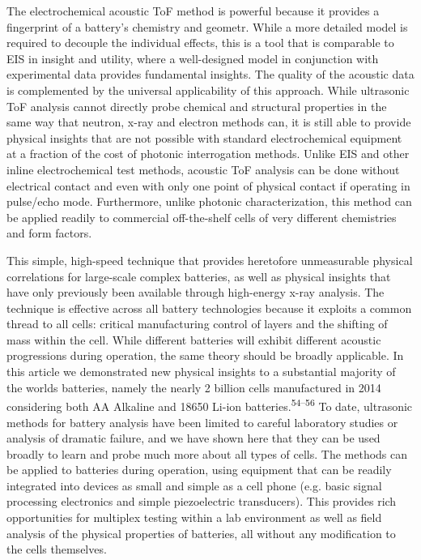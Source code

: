 \documentclass[]{article}
\begin{document}
The electrochemical acoustic ToF method is powerful because it provides
a fingerprint of a battery's chemistry and geometr. While a more
detailed model is required to decouple the individual effects, this is a
tool that is comparable to EIS in insight and utility, where a
well-designed model in conjunction with experimental data provides
fundamental insights. The quality of the acoustic data is complemented
by the universal applicability of this approach. While ultrasonic ToF
analysis cannot directly probe chemical and structural properties in the
same way that neutron, x-ray and electron methods can, it is still able
to provide physical insights that are not possible with standard
electrochemical equipment at a fraction of the cost of photonic
interrogation methods. Unlike EIS and other inline electrochemical test
methods, acoustic ToF analysis can be done without electrical contact
and even with only one point of physical contact if operating in
pulse/echo mode. Furthermore, unlike photonic characterization, this
method can be applied readily to commercial off-the-shelf cells of very
different chemistries and form factors.{~}

This simple, high-speed technique that provides heretofore unmeasurable
physical correlations for large-scale complex batteries, as well as
physical insights that have only previously been available through
high-energy x-ray analysis. The technique is effective across all
battery technologies because it exploits a common thread to all cells:
critical manufacturing control of layers and the shifting of mass within
the cell. While different batteries will exhibit different acoustic
progressions during operation, the same theory should be broadly
applicable. In this article we demonstrated new physical insights to a
substantial majority of the worlds batteries, namely the nearly 2
billion cells manufactured in 2014 considering both AA Alkaline and
18650 Li-ion batteries.\textsuperscript{54--56} To date, ultrasonic
methods for battery analysis have been limited to careful laboratory
studies or analysis of dramatic failure, and we have shown here that
they can be used broadly to learn and probe much more about all types of
cells. The methods can be applied to batteries during operation, using
equipment that can be readily integrated into devices as small and
simple as a cell phone (e.g. basic signal processing electronics and
simple piezoelectric transducers). This provides rich opportunities for
multiplex testing within a lab environment as well as field analysis of
the physical properties of batteries, all without any modification to
the cells themselves.
\end{document}
